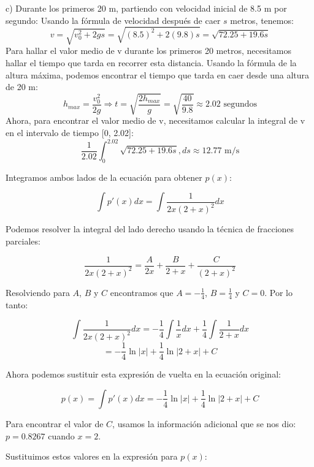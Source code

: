 \documentclass[a4paper, oneside]{report}
\begin{document}
c) Durante los primeros 20 m, partiendo con velocidad inicial de 8.5 m por segundo:
Usando la fórmula de velocidad después de caer $s$ metros, tenemos:
$$v = \sqrt{v_0^2 + 2gs} = \sqrt{(8.5)^2 + 2(9.8)s} = \sqrt{72.25 + 19.6s}$$
Para hallar el valor medio de v durante los primeros 20 metros, necesitamos hallar el tiempo que tarda en recorrer esta distancia. Usando la fórmula de la altura máxima, podemos encontrar el tiempo que tarda en caer desde una altura de 20 m:
$$h_{max} = \frac{v_0^2}{2g} \Rightarrow t = \sqrt{\frac{2h_{max}}{g}} = \sqrt{\frac{40}{9.8}} \approx 2.02 \text{ segundos}$$
Ahora, para encontrar el valor medio de v, necesitamos calcular la integral de v en el intervalo de tiempo [0, 2.02]:
$$\frac{1}{2.02} \int_0^{2.02} \sqrt{72.25 + 19.6s} , ds \approx 12.77 \text{ m/s}$$



Integramos ambos lados de la ecuación para obtener $p(x)$:

$$\int p'(x) dx = \int \frac{1}{2x(2+x)^2} dx $$

Podemos resolver la integral del lado derecho usando la técnica de fracciones parciales:

$$\frac{1}{2x(2+x)^2} = \frac{A}{2x} + \frac{B}{2+x} + \frac{C}{(2+x)^2} $$

Resolviendo para $A$, $B$ y $C$ encontramos que $A = -\frac{1}{4}$, $B = \frac{1}{4}$ y $C = 0$. Por lo tanto:

$$\int \frac{1}{2x(2+x)^2} dx = -\frac{1}{4} \int \frac{1}{x} dx + \frac{1}{4} \int \frac{1}{2+x} dx $$
$$= -\frac{1}{4} \ln |x| + \frac{1}{4} \ln |2+x| + C $$

Ahora podemos sustituir esta expresión de vuelta en la ecuación original:

$$p(x) = \int p'(x) dx = -\frac{1}{4} \ln |x| + \frac{1}{4} \ln |2+x| + C $$

Para encontrar el valor de $C$, usamos la información adicional que se nos dio: $p = 0.8267$ cuando $x = 2$.

Sustituimos estos valores en la expresión para $p(x)$:
\end{document}
